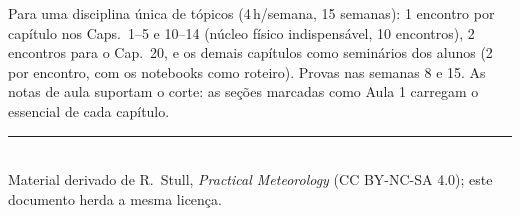 \documentclass[11pt]{article}
\begin{document}
Para uma disciplina única de tópicos (4\,h/semana, 15 semanas):
1 encontro por capítulo nos Caps.~1--5 e 10--14 (núcleo físico
indispensável, 10 encontros), 2 encontros para o Cap.~20, e os demais
capítulos como seminários dos alunos (2 por encontro, com os
notebooks como roteiro). Provas nas semanas 8 e 15. As notas de aula
suportam o corte: as seções marcadas como Aula 1 carregam o essencial
de cada capítulo.

\vspace{1em}
\noindent\rule{\linewidth}{0.4pt}\\
{\scriptsize Material derivado de R.~Stull, \emph{Practical
Meteorology} (CC BY-NC-SA 4.0); este documento herda a mesma licença.}
\end{document}
